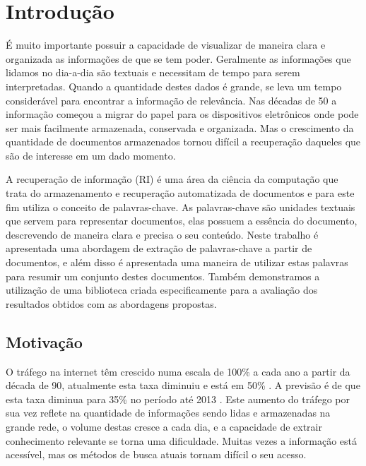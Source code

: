 \chapter{Introdução}
É muito importante possuir a capacidade de visualizar de maneira clara e organizada as informações de que se tem poder. Geralmente as informações que lidamos no dia-a-dia são textuais e necessitam de tempo para serem interpretadas. Quando a quantidade destes dados é grande, se leva um tempo considerável para encontrar a informação de relevância. Nas décadas de 50 a informação começou a migrar do papel para os dispositivos eletrônicos onde pode ser mais facilmente armazenada, conservada e organizada. Mas o crescimento da quantidade de documentos armazenados tornou difícil a recuperação daqueles que são de interesse em um dado momento.

A recuperação de informação (RI) é uma área da ciência da computação que trata do armazenamento e recuperação automatizada de documentos e para este fim utiliza o conceito de palavras-chave. As palavras-chave são unidades textuais que servem para representar documentos, elas possuem a essência do documento, descrevendo de maneira clara e precisa o seu conteúdo.
Neste trabalho é apresentada uma abordagem de extração de palavras-chave a partir de documentos, e além disso é apresentada uma maneira de utilizar estas palavras para resumir um conjunto destes documentos. Também demonstramos a utilização de uma biblioteca criada especificamente para a avaliação dos resultados obtidos com as abordagens propostas.

\section{Motivação}
O tráfego na internet têm crescido numa escala de 100\% a cada ano a partir da década de 90, atualmente esta taxa diminuiu e está em 50\% \cite{Odlyzko2003}. A previsão é de que esta taxa diminua para 35\% no período até 2013 \cite{Cisco2009}. Este aumento do tráfego por sua vez reflete na quantidade de informações sendo lidas e armazenadas na grande rede, o volume destas cresce a cada dia, e a capacidade de extrair conhecimento relevante se torna uma dificuldade. Muitas vezes a informação está acessível, mas os métodos de busca atuais tornam difícil o seu acesso.

